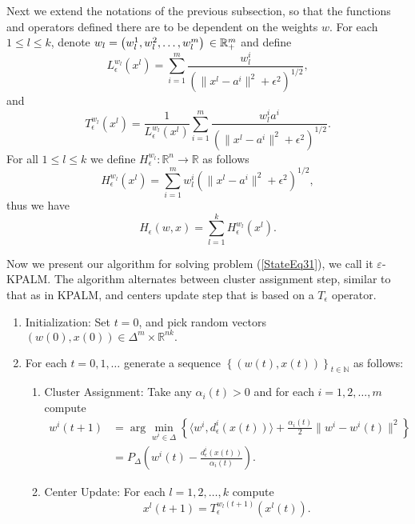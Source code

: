 \documentclass[11pt]{article}
\numberwithin{equation}{section}
\begin{document}
Next we extend the notations of the previous subsection, so that the functions and operators defined there are to be dependent on the weights $w$. For each $1 \leq l \leq k$, denote $w_l = \left( w_l^1, w_l^2, \ldots , w_l^m \right) \\ \in \mathbb{R}_+^m$ and define
\begin{equation*}
 L_{\epsilon}^{w_l}(x^l) = \sum\limits_{i=1}^m \frac{w^i_l}{\left( \|x^l-a^i\|^2 + {\epsilon}^2 \right)^{1/2}} ,
\end{equation*}
and
\begin{equation*}
 T_{\epsilon}^{w_l}(x^l) = \frac{1}{L_{\epsilon}^{w_l}(x^l)} \sum\limits_{i=1}^m \frac{w^i_l a^i}{\left( \|x^l-a^i\|^2 + {\epsilon}^2 \right)^{1/2}}.
\end{equation*}
For all $1 \leq l \leq k$ we define $H_{\epsilon}^{w_l}: \mathbb{R}^n \rightarrow \mathbb{R}$ as follows
\begin{equation*}
 H_{\epsilon}^{w_l}(x^l) = \sum\limits_{i=1}^m w^i_l \left( \|x^l-a^i\|^2 + {\epsilon}^2 \right)^{1/2} ,
\end{equation*}
thus we have 
\begin{equation*}
 H_{\epsilon}(w,x) = \sum\limits_{l=1}^k H_{\epsilon}^{w_l}(x^l) .
\end{equation*}

Now we present our algorithm for solving problem (\ref{StateEq31}), we call it $\varepsilon$-KPALM.  The algorithm alternates between cluster assignment step, similar to that as in KPALM, and centers update step that is based on a $T_{\epsilon}$ operator.

\begin{enumerate}[(1)]
	\item Initialization: Set $t=0$, and pick random vectors $(w(0),x(0)) \in \Delta^m \times \mathbb{R}^{nk} .$

	\item For each $t=0,1, \ldots$ generate a sequence $\left\lbrace(w(t),x(t))\right\rbrace_{t \in \mathbb{N}}$ as follows:
	\begin{enumerate}[(2.1)]
		\item Cluster Assignment: Take any $\alpha_i(t) > 0$ and for each $i=1, 2, \ldots ,m$ compute
		\begin{equation}
		\begin{split}
			w^i(t+1) 
			&= \arg\min\limits_{w^i \in \Delta} \left\lbrace \langle w^i , d_{\epsilon}^i(x(t)) \rangle + \frac{\alpha_i(t)}{2} \|w^i - w^i(t)\|^2 \right\rbrace \\ 
			&= P_{\Delta} \left(w^i(t) - \frac{d_{\epsilon}^i(x(t))}{\alpha_i(t)}\right) . \label{StateEq32}
		\end{split}
		\end{equation}
		
		\item Center Update: For each $l=1, 2, \ldots ,k$ compute 
		\begin{equation}
			x^l(t+1) = T_{\epsilon}^{w_l(t+1)}(x^l(t)) . \label{StateEq33}
		\end{equation}
	\end{enumerate}
\end{enumerate}
\end{document}

